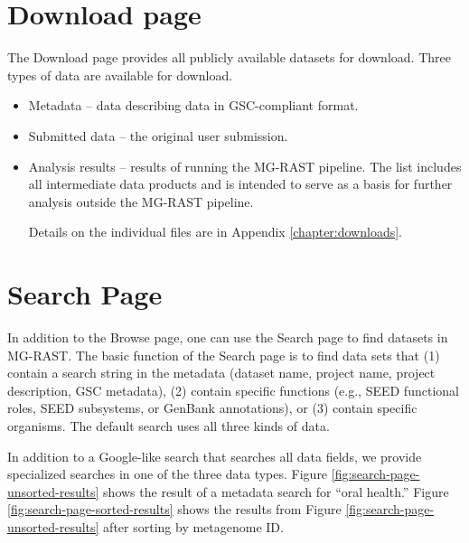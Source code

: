 \documentclass[12pt,fullpage]{report}
\begin{document}
\section{Download page}

The Download page provides all publicly available datasets for download.
Three types of data are available for download.

\begin{itemize}
\item Metadata --
data describing data in GSC-compliant format.

\item Submitted data --
the original user submission.

\item Analysis results --
results of running the MG-RAST pipeline. The list includes all intermediate data products and is intended to serve as a basis for further analysis outside the MG-RAST pipeline.

Details on the individual files are in Appendix \ref{chapter:downloads}.
\end{itemize}





\section{Search Page}
\label{section:search-page}

In addition to the Browse page, one can use
the Search page to find datasets in MG-RAST.
The basic function of the Search page is to find data sets that (1) contain a search string in the metadata (dataset name, project name, project description, GSC metadata), (2) contain specific functions (e.g., SEED functional roles, SEED subsystems, or GenBank annotations), or (3) contain specific organisms. The default search uses all three kinds of data.

In addition to a Google-like search that searches all data fields, we provide specialized searches in one of the three data types. Figure
\ref{fig:search-page-unsorted-results} shows the result of a metadata search for ``oral health.''
Figure \ref{fig:search-page-sorted-results} shows the results from Figure \ref{fig:search-page-unsorted-results} after sorting by metagenome ID.
\end{document}
